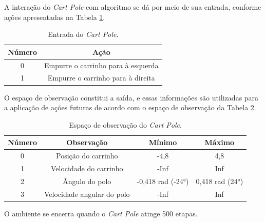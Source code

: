 \documentclass[12pt,           %
a4paper,                       %
openany,                       %
oneside,                       %
chapter=TITLE,                 %
english,                       %
spanish,                       %
brazil,                        %
sumario=tradicional]{abntex2}  %
\begin{document}
\begin{OnehalfSpace}
A interação do \textit{Cart Pole} com algoritmo se dá por meio de sua entrada, conforme ações apresentadas na Tabela \ref{tab:intcartpole1}.

\begin{table}[H]
	\centering
	\vspace*{-0.2cm}
	\caption{Entrada do \textit{Cart Pole}.}
	\begin{tabular}{|c|c|}
            \hline
            Número & Ação  \\
            \hline
            0 & Empurre o carrinho para à esquerda \\
            \hline
            1 & Empurre o carrinho para à direita \\
            \hline
	\end{tabular}  
    \label{tab:intcartpole1}                 %
\end{table}
\vspace*{-0.7cm}
{\raggedright {}}

O espaço de observação constitui a saída, e essas informações são utilizadas para a aplicação de ações futuras de acordo com o espaço de observação da Tabela \ref{tab:outcartpole}.

\begin{table}[H]
	\centering
	\vspace*{-0.2cm}
	\caption{Espaço de observação do \textit{Cart Pole}.}
        \begin{tabular}{|c|c|c|c|}
            \hline
            Número & Observação & Mínimo & Máximo  \\
            \hline
            0 & Posição do carrinho & -4,8 & 4,8\\
            \hline
            1 & Velocidade do carrinho & -Inf & Inf\\
            \hline
            2 & Ângulo do polo &  -0,418 rad (-24°) & 0,418 rad (24°)\\
            \hline
            3 & Velocidade angular do polo & -Inf & Inf\\
            \hline
    \end{tabular}  
    \label{tab:outcartpole}                 %
\end{table}
\vspace*{-0.7cm}
{\raggedright {}}

O ambiente se encerra quando o \textit{Cart Pole} atinge 500 etapas.


\end{OnehalfSpace}
\end{document}
